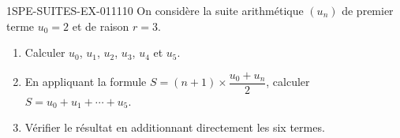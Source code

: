 \begin{exercice}{1SPE-SUITES-EX-011}{1}{10}
On considère la suite arithmétique $(u_n)$ de premier terme $u_0 = 2$ et de raison $r = 3$.
\begin{enumerate}
  \item Calculer $u_0$, $u_1$, $u_2$, $u_3$, $u_4$ et $u_5$.
  \item En appliquant la formule
        $S = (n+1) \times \dfrac{u_0 + u_n}{2}$,
        calculer $S = u_0 + u_1 + \cdots + u_5$.
  \item Vérifier le résultat en additionnant directement les six termes.
\end{enumerate}
\end{exercice}
